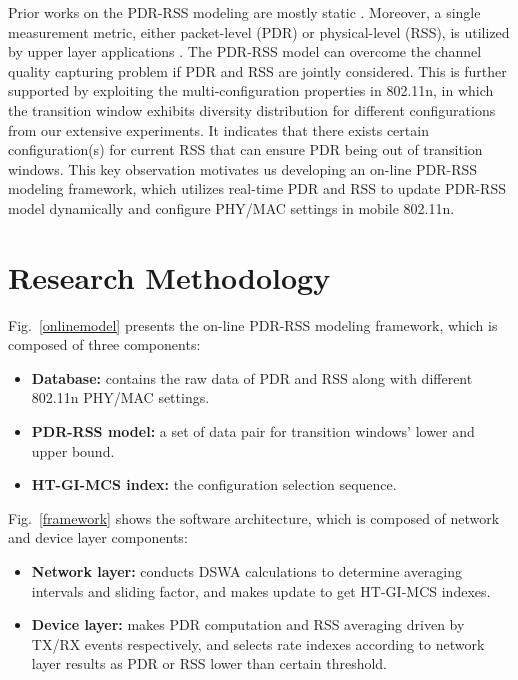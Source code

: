 \documentclass[draftclsnofoot,conference,onecolumn,11pt]{IEEEtran}
\begin{document}
Prior works on the PDR-RSS modeling are mostly static \cite{kashyap2007capacity} \cite{kolar2011mesh} \cite{reis2006model}. Moreover, a single measurement metric, either packet-level (PDR) or physical-level (RSS), is utilized by upper layer applications\cite{judd2008efficient} \cite{zhang2008practical}. The PDR-RSS model can overcome the channel quality capturing problem if PDR and RSS are jointly considered. This is further supported by exploiting the multi-configuration properties in 802.11n, in which the transition window exhibits diversity distribution for different configurations from our extensive experiments. It indicates that there exists certain configuration(s) for current RSS that can ensure PDR being out of transition windows. This key observation motivates us developing an on-line PDR-RSS modeling framework, which utilizes real-time PDR and RSS to update PDR-RSS model dynamically and configure PHY/MAC settings in mobile 802.11n.

\section{Research Methodology}

Fig.~\ref{onlinemodel} presents the on-line PDR-RSS modeling framework, which is composed of three components:
\begin{itemize}
  \item \textbf{Database:} contains the raw data of PDR and RSS along with different 802.11n PHY/MAC settings.
  \item \textbf{PDR-RSS model:} a set of data pair for transition windows' lower and upper bound.
  \item \textbf{HT-GI-MCS index:} the configuration selection sequence.
\end{itemize}

Fig.~\ref{framework} shows the software architecture, which is composed of network and device layer components:
\begin{itemize}
  \item \textbf{Network layer:} conducts DSWA calculations to determine averaging intervals and sliding factor, and makes update to get HT-GI-MCS indexes.
  \item \textbf{Device layer:} makes PDR computation and RSS averaging driven by TX/RX events respectively, and selects rate indexes according to network layer results as PDR or RSS lower than certain threshold.
\end{itemize}
\end{document}
